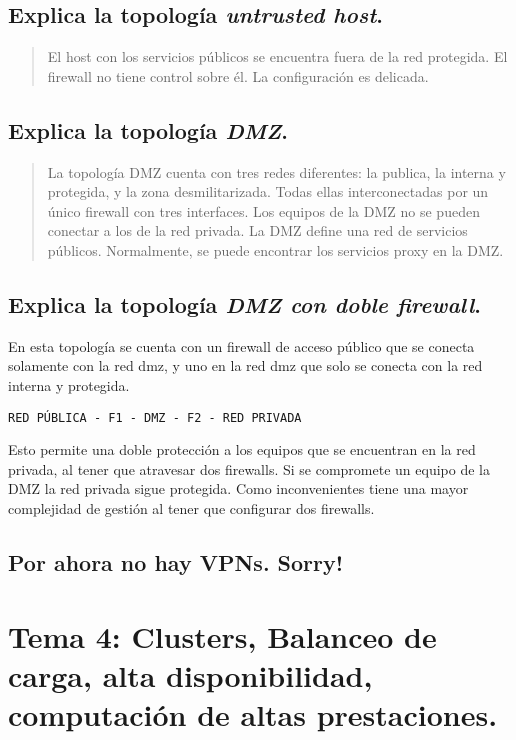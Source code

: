 \documentclass[11pt]{article}
\begin{document}
\subsection{Explica la topología \emph{untrusted host}.}
\label{sec:orga956e38}
\begin{quote}
El host con los servicios públicos se encuentra fuera de la red protegida. El firewall no tiene control sobre él. La configuración es delicada.
\end{quote}
\subsection{Explica la topología \emph{DMZ}.}
\label{sec:org7835048}
\begin{quote}
La topología DMZ cuenta con tres redes diferentes: la publica, la interna y protegida, y la zona desmilitarizada. Todas ellas interconectadas por un único firewall con tres interfaces.
Los equipos de la DMZ no se pueden conectar a los de la red privada. La DMZ define una red de servicios públicos. Normalmente, se puede encontrar los servicios proxy en la DMZ.
\end{quote}

\subsection{Explica la topología \emph{DMZ con doble firewall}.}
\label{sec:org1c20bc6}
En esta topología se cuenta con un firewall de acceso público que se conecta solamente con la red dmz, y uno en la red dmz que solo se conecta con la red interna y protegida.

\begin{verbatim}
RED PÚBLICA - F1 - DMZ - F2 - RED PRIVADA
\end{verbatim}

Esto permite una doble protección a los equipos que se encuentran en la red privada, al tener que atravesar dos firewalls. Si se compromete un equipo de la DMZ la red privada sigue protegida. Como inconvenientes tiene una mayor complejidad de gestión al tener que configurar dos firewalls.

\subsection{Por ahora no hay VPNs. Sorry!}
\label{sec:org5341c61}
\section{Tema 4: Clusters, Balanceo de carga, alta disponibilidad, computación de altas prestaciones.}
\label{sec:org11be809}
\end{document}
